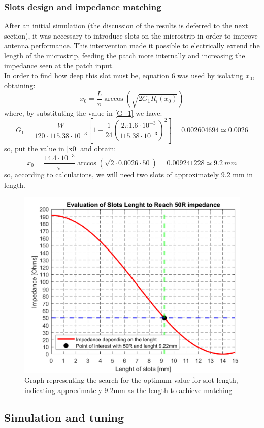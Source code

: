 \documentclass[]{article}
\begin{document}
 \subsubsection{Slots design and impedance matching}
 After an initial simulation (the discussion of the results is deferred to the next section), it was necessary to introduce slots on the microstrip in order to improve antenna performance. This intervention made it possible to electrically extend the length of the microstrip, feeding the patch more internally and increasing the impedance seen at the patch input.\\
 In order to find how deep this slot must be, equation 6 was used by isolating $x_0$, obtaining: 
 \begin{equation}
 	x_0 = \frac{L}{\pi} \arccos\left(\sqrt{2G_1 R_i(x_0)}\right)
 	\label{x0}
 \end{equation}
 where, by substituting the value in \eqref{G_1} we have:
 \[
 G_1=\frac{W}{120 \cdot 115.38 \cdot 10^{-3}
  }\left[ 1-\frac{1}{24}(\frac{2 \pi 1.6\cdot 10^{-3}}{ 115.38 \cdot 10^{-3}})^2\right] = 0.002604694 \simeq 0.0026  
 \]
 so, put the value in \eqref{x0} and obtain: 
 \[
 x_0 = \frac{14.4 \cdot 10^{-3}}{\pi} \arccos\left(\sqrt{2 \cdot 0.0026 \cdot  50}\right) =  0.009241228 \simeq 9.2 \ mm
 \]
so, according to calculations, we will need two slots of approximately 9.2 mm in length.
\begin{figure}[h]
	\centering
	\includegraphics[width=0.32\linewidth]{img/img9}
	\caption{Graph representing the search for the optimum value for slot length, indicating approximately 9.2mm as the length to achieve matching}
	\label{fig:img9}
\end{figure}

\newpage

\subsection{Simulation and tuning}
\end{document}
